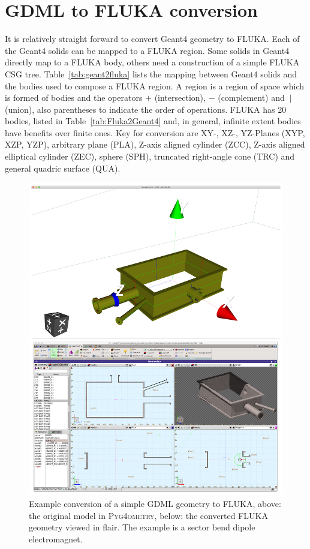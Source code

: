 \documentclass[final,5p,times,twocolumn]{elsarticle}
\newcommand{\PYGEOMETRY}{\textsc{Pyg4ometry}}
\begin{document}
\section{GDML to FLUKA conversion}
It is relatively straight forward to convert Geant4 geometry to FLUKA. Each of the Geant4 
solids can be mapped to a FLUKA region. Some solids in Geant4 directly map to 
a FLUKA body, others need a construction of a simple FLUKA CSG tree. Table~\ref{tab:geant2fluka}
lists the mapping between Geant4 solids and the bodies used to compose a FLUKA region.
A region is a region of space which is formed of bodies and the operators $+$ (intersection), $-$ 
(complement) and $\:|\:$ (union), also parentheses to indicate the order of operations. FLUKA 
has 20 bodies, listed in Table~\ref{tab:Fluka2Geant4}  and, in general, infinite extent bodies have 
benefits over finite ones. Key for conversion are XY-, XZ-, YZ-Planes (XYP, XZP, YZP), arbitrary 
plane (PLA), Z-axis aligned cylinder (ZCC), Z-axis aligned elliptical cylinder (ZEC), 
sphere (SPH), truncated right-angle cone (TRC) and general quadric surface (QUA). 
\begin{figure}
\begin{center}
\includegraphics[width=0.9\columnwidth]{./model-scene/CuboidalChamber.pdf}
\caption{Example conversion of a simple GDML geometry to FLUKA, above:
the original model in \PYGEOMETRY{}, below: the converted FLUKA geometry
viewed in flair. The example is a sector bend dipole electromagnet.}
\label{fig:gdml-flair}
\end{center}
\end{figure}
\end{document}
